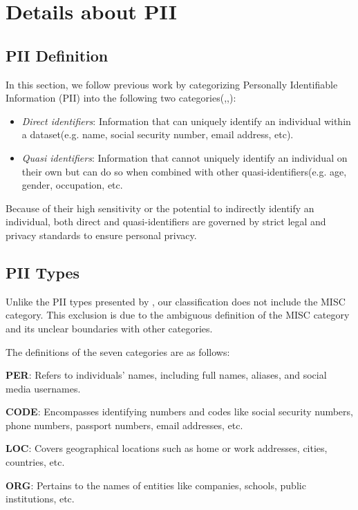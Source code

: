\appendix

\section{Details about PII}
\label{sec:pii}
\subsection{PII Definition}
\label{sec:def}
In this section, we follow previous work by categorizing Personally Identifiable Information (PII) into the following two categories(\citealp{elliot2016anonymisation},\citealp{domingo2022database},\citealp{papadopoulou2022neural}):
\begin{itemize}
    \item \textit{Direct identifiers}: Information that can uniquely identify an individual within a dataset(e.g. name, social security number, email address, etc). 
    \item \textit{Quasi identifiers}: Information that cannot uniquely identify an individual on their own but can do so when combined with other quasi-identifiers(e.g. age, gender, occupation, etc.
\end{itemize}

Because of their high sensitivity or the potential to indirectly identify an individual, both direct and quasi-identifiers are governed by strict legal and privacy standards to ensure personal privacy.

\subsection{PII Types}
\label{sec:type}
Unlike the PII types presented by , our classification does not include the MISC category. This exclusion is due to the ambiguous definition of the MISC category and its unclear boundaries with other categories.

The definitions of the seven categories are as follows: 

\textbf{PER}: Refers to individuals' names, including full names, aliases, and social media usernames.

\textbf{CODE}: Encompasses identifying numbers and codes like social security numbers, phone numbers, passport numbers, email addresses, etc.

\textbf{LOC}: Covers geographical locations such as home or work addresses, cities, countries, etc.

\textbf{ORG}: Pertains to the names of entities like companies, schools, public institutions, etc.


